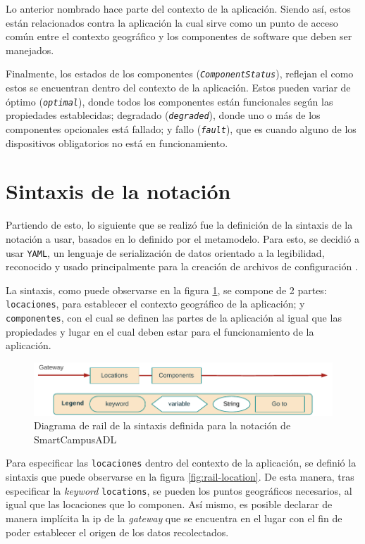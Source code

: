 Lo anterior nombrado hace parte del contexto de la aplicación. Siendo así, estos están relacionados contra la aplicación la cual sirve como un punto de acceso común entre el contexto geográfico y los componentes de software que deben ser manejados.

Finalmente, los estados de los componentes (\textit{\texttt{ComponentStatus}}), reflejan el como estos se encuentran dentro del contexto de la aplicación. Estos pueden variar de óptimo (\textit{\texttt{optimal}}), donde todos los componentes están funcionales según las propiedades establecidas; degradado (\textit{\texttt{degraded}}), donde uno o más de los componentes opcionales está fallado; y fallo (\textit{\texttt{fault}}), que es cuando alguno de los dispositivos obligatorios no está en funcionamiento.

\section{Sintaxis de la notación}

Partiendo de esto, lo siguiente que se realizó fue la definición de la sintaxis de la notación a usar, basados en lo definido por el metamodelo. Para esto, se decidió a usar \texttt{YAML}, un lenguaje de serialización de datos orientado a la legibilidad, reconocido y usado principalmente para la creación de archivos de configuración \cite{YAML2023}. 

La sintaxis, como puede observarse en la figura \ref{fig:rail-base}, se compone de 2 partes: \texttt{locaciones}, para establecer el contexto geográfico de la aplicación; y \texttt{componentes}, con el cual se definen las partes de la aplicación al igual que las propiedades y lugar en el cual deben estar para el funcionamiento de la aplicación.

\begin{figure}[H]
    \centering
    \caption{Diagrama de rail de la sintaxis definida para la notación de SmartCampusADL}
    \label{fig:rail-base}
    \vspace{2mm}
    \includegraphics[width=\linewidth]{images/Railroad Base.pdf}
\end{figure}

Para especificar las \texttt{locaciones} dentro del contexto de la aplicación, se definió la sintaxis que puede observarse en la figura \ref{fig:rail-location}. De esta manera, tras especificar la \textit{keyword} \texttt{locations}, se pueden los puntos geográficos necesarios, al igual que las locaciones que lo componen. Así mismo, es posible declarar de manera implícita la ip de la \textit{gateway} que se encuentra en el lugar con el fin de poder establecer el origen de los datos recolectados. 

